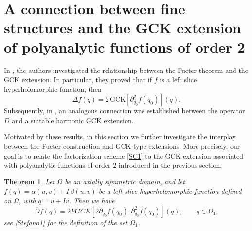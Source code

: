 \documentclass[reqno,11pt]{amsart}
\numberwithin{equation}{section}
\newtheorem{theorem}{Theorem}[section]
\theoremstyle{definition}
\begin{document}
\section{A connection between fine structures and the GCK extension of polyanalytic functions of order 2}

In \cite{DDG}, the authors investigated the relationship between the Fueter theorem and the GCK extension. In particular, they proved that if $f$ is a left slice hyperholomorphic function, then
$$
\Delta f(q)=2\,\mathrm{GCK}\!\left[\partial_{q_0}^2f(q_0)\right](q).
$$
Subsequently, in \cite{DG}, an analogous connection was established between the operator $D$ and a suitable harmonic GCK extension.

Motivated by these results, in this section we further investigate the interplay between the Fueter construction and GCK-type extensions. More precisely, our goal is to relate the factorization scheme \eqref{SC1} to the GCK extension associated with polyanalytic functions of order $2$ introduced in the previous section.


\begin{theorem}
\label{appDbar}
Let $\Omega$ be an axially symmetric domain, and let $f(q)=\alpha(u,v)+I\,\beta(u,v)$ be a left slice hyperholomorphic function defined on $\Omega$, with $q=u+Iv$. Then we have
\begin{equation}
\label{app2}
\overline{D}f(q)=2 PGCK[2 \partial_{q_0}f(q_0), \partial_{q_0}^2f(q_0)](q), \qquad q \in \Omega_1,
\end{equation}
see \eqref{Stefano1} for the definition of the set $\Omega_1$.


\end{theorem}
\end{document}
